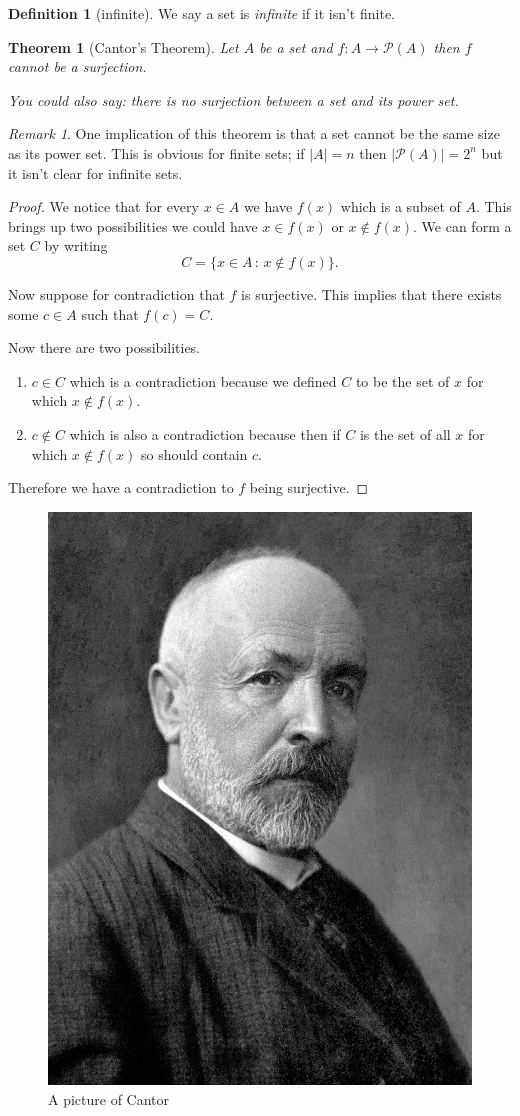 \documentclass[
]{book}
\newtheorem{theorem}{Theorem}[chapter]
\theoremstyle{definition}
\newtheorem{definition}{Definition}[chapter]
\theoremstyle{definition}
\theoremstyle{definition}
\theoremstyle{definition}
\theoremstyle{remark}
\newtheorem*{remark}{Remark}
\begin{document}
\begin{definition}[infinite]
We say a set is \emph{infinite} if it isn't finite.
\end{definition}

\begin{theorem}[Cantor's Theorem]
Let \(A\) be a set and \(f: A \rightarrow \mathcal{P}(A)\) then \(f\) cannot be a surjection.

You could also say: there is no surjection between a set and its power set.
\end{theorem}

\begin{remark}
One implication of this theorem is that a set cannot be the same size as its power set. This is obvious for finite sets; if \(|A|=n\) then \(|\mathcal{P}(A)|= 2^n\) but it isn't clear for infinite sets.
\end{remark}

\begin{proof}
We notice that for every \(x \in A\) we have \(f(x)\) which is a subset of \(A\). This brings up two possibilities we could have \(x \in f(x)\) or \(x \notin f(x)\). We can form a set \(C\) by writing
\[ C = \{ x \in A\,:\, x \notin f(x)\}.  \]

Now suppose for contradiction that \(f\) is surjective. This implies that there exists some \(c \in A\) such that \(f(c) = C\).

Now there are two possibilities.

\begin{enumerate}
\def\labelenumi{\arabic{enumi}.}
\item
  \(c \in C\) which is a contradiction because we defined \(C\) to be the set of \(x\) for which \(x \notin f(x)\).
\item
  \(c \notin C\) which is also a contradiction because then if \(C\) is the set of all \(x\) for which \(x \notin f(x)\) so should contain \(c\).
\end{enumerate}

Therefore we have a contradiction to \(f\) being surjective.
\end{proof}

\begin{figure}
\includegraphics[width=0.3\linewidth]{Cantor} \caption{A picture of Cantor}\label{fig:unnamed-chunk-5}
\end{figure}
\end{document}
